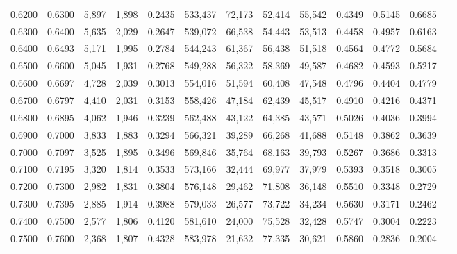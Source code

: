 \begin{tabular}{rrrrrrrrrrrrr}
0.6200 & 0.6300 &  5,897 & 1,898 &                                     0.2435 & 533,437 &  72,173 &  52,414 &  55,542 & 0.4349 & 0.5145 & 0.6685 \\
0.6300 & 0.6400 &  5,635 & 2,029 &                                     0.2647 & 539,072 &  66,538 &  54,443 &  53,513 & 0.4458 & 0.4957 & 0.6163 \\
0.6400 & 0.6493 &  5,171 & 1,995 &                                     0.2784 & 544,243 &  61,367 &  56,438 &  51,518 & 0.4564 & 0.4772 & 0.5684 \\
0.6500 & 0.6600 &  5,045 & 1,931 &                                     0.2768 & 549,288 &  56,322 &  58,369 &  49,587 & 0.4682 & 0.4593 & 0.5217 \\
0.6600 & 0.6697 &  4,728 & 2,039 &                                     0.3013 & 554,016 &  51,594 &  60,408 &  47,548 & 0.4796 & 0.4404 & 0.4779 \\
0.6700 & 0.6797 &  4,410 & 2,031 &                                     0.3153 & 558,426 &  47,184 &  62,439 &  45,517 & 0.4910 & 0.4216 & 0.4371 \\
0.6800 & 0.6895 &  4,062 & 1,946 &                                     0.3239 & 562,488 &  43,122 &  64,385 &  43,571 & 0.5026 & 0.4036 & 0.3994 \\
0.6900 & 0.7000 &  3,833 & 1,883 &                                     0.3294 & 566,321 &  39,289 &  66,268 &  41,688 & 0.5148 & 0.3862 & 0.3639 \\
0.7000 & 0.7097 &  3,525 & 1,895 &                                     0.3496 & 569,846 &  35,764 &  68,163 &  39,793 & 0.5267 & 0.3686 & 0.3313 \\
0.7100 & 0.7195 &  3,320 & 1,814 &                                     0.3533 & 573,166 &  32,444 &  69,977 &  37,979 & 0.5393 & 0.3518 & 0.3005 \\
0.7200 & 0.7300 &  2,982 & 1,831 &                                     0.3804 & 576,148 &  29,462 &  71,808 &  36,148 & 0.5510 & 0.3348 & 0.2729 \\
0.7300 & 0.7395 &  2,885 & 1,914 &                                     0.3988 & 579,033 &  26,577 &  73,722 &  34,234 & 0.5630 & 0.3171 & 0.2462 \\
0.7400 & 0.7500 &  2,577 & 1,806 &                                     0.4120 & 581,610 &  24,000 &  75,528 &  32,428 & 0.5747 & 0.3004 & 0.2223 \\
0.7500 & 0.7600 &  2,368 & 1,807 &                                     0.4328 & 583,978 &  21,632 &  77,335 &  30,621 & 0.5860 & 0.2836 & 0.2004 \\

\end{tabular}

